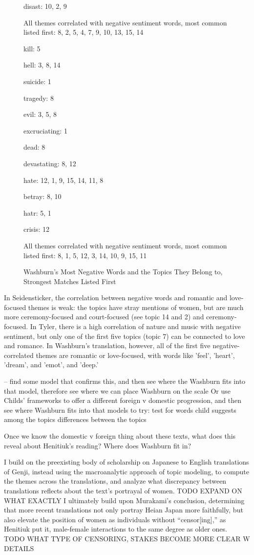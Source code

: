 \documentclass[12pt]{article}
\begin{document}
\begin{flushleft}
\begin{spacing}{2.0}
\begin{figure}
	disast: 10, 2, 9
	
	All themes correlated with negative sentiment words, most common listed first: 8, 2, 5, 4, 7, 9, 10, 13, 15, 14
\end{figure}

\begin{figure}
	\caption{Washburn's Most Negative Words and the Topics They Belong to, Strongest Matches Listed First}
	\label{washburn-sentiment-topics}
	kill: 5
	
	hell: 3, 8, 14
	
	suicide: 1
	
	tragedy: 8
	
	evil: 3, 5, 8
	
	excruciating: 1
	
	dead: 8
	
	devastating: 8, 12
	
	hate: 12, 1, 9, 15, 14, 11, 8
	
	betray: 8, 10
	
	hatr: 5, 1
	
	crisis: 12
	
	All themes correlated with negative sentiment words, most common listed first: 8, 1, 5, 12, 3, 14, 10, 9, 15, 11
\end{figure}

In Seidensticker, the correlation between negative words and romantic and love-focused themes is weak: the topics have stray mentions of women, but are much more ceremony-focused and court-focused (see topic 14 and 2) and ceremony-focused. In Tyler, there is a high correlation of nature and music with negative sentiment, but only one of the first five topics (topic 7) can be connected to love and romance. In Washburn's translation, however, all of the first five negative-correlated themes are romantic or love-focused, with words like 'feel', 'heart', 'dream', and 'emot', and 'deep.'

-- find some model that confirms this, and then see where the Washburn fits into that model, therefore see where we can place Washburn on the scale
Or use Childs' frameworks to offer a different foreign v domestic progression, and then see where Washburn fits into that
models to try: test for words child suggests among the topics
differences between the topics 

Once we know the domestic v foreign thing about these texts, what does this reveal about Henitiuk's reading? Where does Washburn fit in?

I build on the preexisting body of scholarship on Japanese to English translations of Genji, instead using the macroanalytic approach of topic modeling, to compute the themes across the translations, and analyze what discrepancy between translations reflects about the text's portrayal of women. TODO EXPAND ON WHAT EXACTLY I ultimately build upon Murakami's conclusion, determining that more recent translations not only portray Heian Japan more faithfully, but also elevate the position of women as individuals without ``censor[ing],'' as Henitiuk put it, male-female interactions to the same degree as older ones. TODO WHAT TYPE OF CENSORING, STAKES BECOME MORE CLEAR W DETAILS


\end{spacing}
\end{flushleft}
\end{document}
